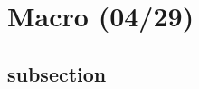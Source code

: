 \documentclass{article}
\begin{document}
\displayoptions

\section{Macro (04/29)}

\subsection{subsection}
\label{sub:subsection}



\end{document}
